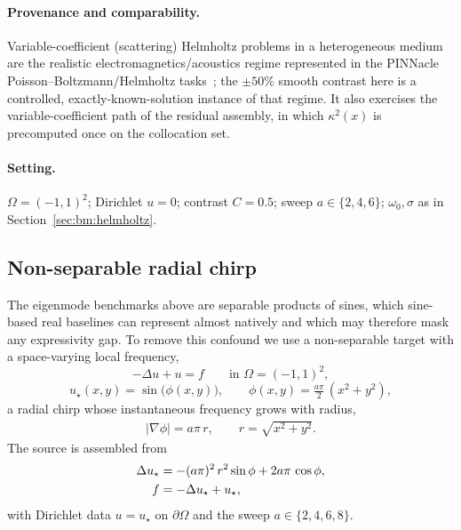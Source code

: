 \paragraph{Provenance and comparability.}
Variable-coefficient (scattering) Helmholtz problems in a heterogeneous medium
are the realistic electromagnetics/acoustics regime represented in the PINNacle
Poisson--Boltzmann/Helmholtz tasks~\cite{Hao2024PINNacle}; the \(\pm 50\%\)
smooth contrast here is a controlled, exactly-known-solution instance of that
regime. It also exercises the variable-coefficient path of the residual
assembly, in which \(\kappa^2(x)\) is precomputed once on the collocation set.

\paragraph{Setting.}
\(\Omega=(-1,1)^2\); Dirichlet \(u=0\); contrast \(C=0.5\);
sweep \(a\in\{2,4,6\}\); \(\omega_0,\sigma\) as in
Section~\ref{sec:bm:helmholtz}.

\subsection{Non-separable radial chirp}\label{sec:bm:chirp}

The eigenmode benchmarks above are separable products of sines, which
sine-based real baselines can represent almost natively and which may therefore
mask any expressivity gap. To remove this confound we use a non-separable target
with a space-varying local frequency,
\begin{equation}\label{eq:chirp_pde}
  -\Delta u + u = f
  \qquad \text{in } \Omega = (-1,1)^2,
\end{equation}
\begin{equation}\label{eq:chirp_sol}
  u_\star(x,y) = \sin\!\big(\phi(x,y)\big),
  \qquad
  \phi(x,y) = \tfrac{a\pi}{2}\,(x^2 + y^2),
\end{equation}
a radial chirp whose instantaneous frequency grows with radius,
\begin{align}\label{eq:chirp_freq}
  |\nabla\phi| = a\pi\,r, \qquad r = \sqrt{x^2+y^2}.
\end{align}
The source is assembled from
\begin{align}\label{eq:chirp_source}
  \Delta u_\star
  &= -(a\pi)^2\,r^2 \sin\phi + 2a\pi\,\cos\phi, \notag\\
  f &= -\Delta u_\star + u_\star,
\end{align}
with Dirichlet data \(u = u_\star\) on \(\partial\Omega\) and the sweep
\(a \in \{2,4,6,8\}\).

